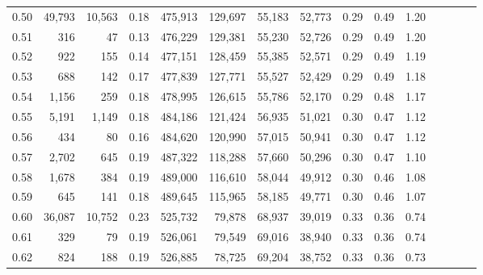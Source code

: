 \begin{tabular}{rrrcrrrrrrrrrrr}
0.50 &  49,793 &  10,563 &                                       0.18 &  475,913 &  129,697 &   55,183 &   52,773 &  0.29 &  0.49 &                         1.20 \\
0.51 &     316 &      47 &                                       0.13 &  476,229 &  129,381 &   55,230 &   52,726 &  0.29 &  0.49 &                         1.20 \\
0.52 &     922 &     155 &                                       0.14 &  477,151 &  128,459 &   55,385 &   52,571 &  0.29 &  0.49 &                         1.19 \\
0.53 &     688 &     142 &                                       0.17 &  477,839 &  127,771 &   55,527 &   52,429 &  0.29 &  0.49 &                         1.18 \\
0.54 &   1,156 &     259 &                                       0.18 &  478,995 &  126,615 &   55,786 &   52,170 &  0.29 &  0.48 &                         1.17 \\
0.55 &   5,191 &   1,149 &                                       0.18 &  484,186 &  121,424 &   56,935 &   51,021 &  0.30 &  0.47 &                         1.12 \\
0.56 &     434 &      80 &                                       0.16 &  484,620 &  120,990 &   57,015 &   50,941 &  0.30 &  0.47 &                         1.12 \\
0.57 &   2,702 &     645 &                                       0.19 &  487,322 &  118,288 &   57,660 &   50,296 &  0.30 &  0.47 &                         1.10 \\
0.58 &   1,678 &     384 &                                       0.19 &  489,000 &  116,610 &   58,044 &   49,912 &  0.30 &  0.46 &                         1.08 \\
0.59 &     645 &     141 &                                       0.18 &  489,645 &  115,965 &   58,185 &   49,771 &  0.30 &  0.46 &                         1.07 \\
0.60 &  36,087 &  10,752 &                                       0.23 &  525,732 &   79,878 &   68,937 &   39,019 &  0.33 &  0.36 &                         0.74 \\
0.61 &     329 &      79 &                                       0.19 &  526,061 &   79,549 &   69,016 &   38,940 &  0.33 &  0.36 &                         0.74 \\
0.62 &     824 &     188 &                                       0.19 &  526,885 &   78,725 &   69,204 &   38,752 &  0.33 &  0.36 &                         0.73 \\

\end{tabular}
